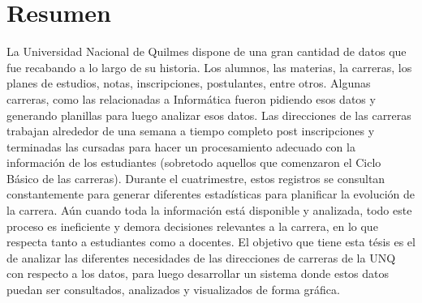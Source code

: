 \chapter*{Resumen}
La Universidad Nacional de Quilmes dispone de una gran cantidad de datos que fue recabando a lo largo de su historia. Los alumnos, las materias, la carreras, los planes de estudios, notas, inscripciones, postulantes, entre otros. 
Algunas carreras, como las relacionadas a Informática fueron pidiendo esos datos y generando planillas para luego analizar esos datos. Las direcciones de las carreras trabajan alrededor de una semana a tiempo completo post inscripciones y terminadas las cursadas para hacer un procesamiento adecuado con  la información de los estudiantes (sobretodo aquellos que comenzaron el Ciclo Básico de las carreras). Durante el cuatrimestre, estos registros se consultan constantemente para generar diferentes estadísticas para planificar la evolución de la carrera. Aún cuando toda la información está disponible y analizada, todo este proceso es ineficiente y demora decisiones relevantes a la carrera, en lo que respecta tanto a estudiantes como a docentes.
El objetivo que tiene  esta tésis es el de analizar las diferentes necesidades de las direcciones de carreras de la UNQ con respecto a los datos, para luego desarrollar un sistema donde estos datos puedan ser consultados, analizados y visualizados de forma gráfica.